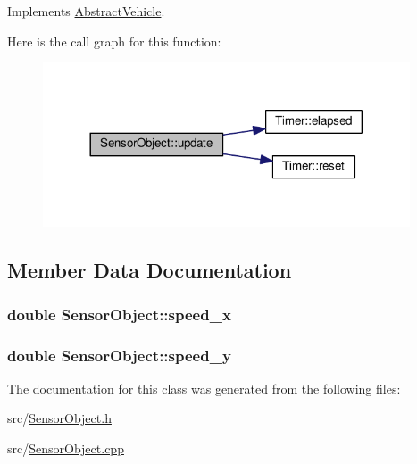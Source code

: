 Implements \hyperlink{classAbstractVehicle_a004b43b4a4d02ca6122ed8862c672de3}{Abstract\+Vehicle}.



Here is the call graph for this function\+:\nopagebreak
\begin{figure}[H]
\begin{center}
\leavevmode
\includegraphics[width=308pt]{classSensorObject_a4d0023c0d36c15df10aade6ec224cc56_cgraph}
\end{center}
\end{figure}




\subsection{Member Data Documentation}
\subsubsection[{\texorpdfstring{speed\+\_\+x}{speed_x}}]{\setlength{\rightskip}{0pt plus 5cm}double Sensor\+Object\+::speed\+\_\+x\hspace{0.3cm}{\ttfamily [protected]}}\hypertarget{classSensorObject_ae33a03dcbff51436ce91dbdc8c27f4b3}{}\label{classSensorObject_ae33a03dcbff51436ce91dbdc8c27f4b3}
\subsubsection[{\texorpdfstring{speed\+\_\+y}{speed_y}}]{\setlength{\rightskip}{0pt plus 5cm}double Sensor\+Object\+::speed\+\_\+y\hspace{0.3cm}{\ttfamily [protected]}}\hypertarget{classSensorObject_aa5fa4bb2ebea9261cdb80b0ef31cb386}{}\label{classSensorObject_aa5fa4bb2ebea9261cdb80b0ef31cb386}


The documentation for this class was generated from the following files\+:\begin{DoxyCompactItemize}
\item 
src/\hyperlink{SensorObject_8h}{Sensor\+Object.\+h}\item 
src/\hyperlink{SensorObject_8cpp}{Sensor\+Object.\+cpp}\end{DoxyCompactItemize}

